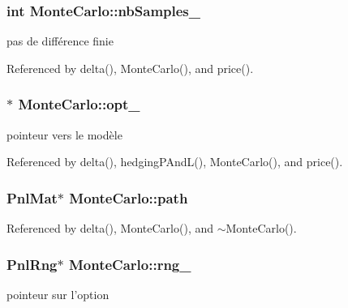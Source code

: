 \hypertarget{classMonteCarlo_a82f5bfded3f8b62f22afaa50f7e73ffe}{
\subsubsection[{nb\-Samples\-\_\-}]{\setlength{\rightskip}{0pt plus 5cm}int Monte\-Carlo\-::nb\-Samples\-\_\-}}\label{classMonteCarlo_a82f5bfded3f8b62f22afaa50f7e73ffe}
pas de différence finie 

Referenced by delta(), Monte\-Carlo(), and price().

\hypertarget{classMonteCarlo_af0ee580b0eb87f57c7a41cd2a9e6fc6a}{
\subsubsection[{opt\-\_\-}]{$\ast$ Monte\-Carlo\-::opt\-\_\-}}\label{classMonteCarlo_af0ee580b0eb87f57c7a41cd2a9e6fc6a}
pointeur vers le modèle 

Referenced by delta(), hedging\-P\-And\-L(), Monte\-Carlo(), and price().

\hypertarget{classMonteCarlo_acf1971465a6503457dfacd397f29ee89}{
\subsubsection[{path}]{\setlength{\rightskip}{0pt plus 5cm}Pnl\-Mat$\ast$ Monte\-Carlo\-::path\hspace{0.3cm}{\ttfamily [private]}}}\label{classMonteCarlo_acf1971465a6503457dfacd397f29ee89}


Referenced by delta(), Monte\-Carlo(), and $\sim$\-Monte\-Carlo().

\hypertarget{classMonteCarlo_aa41318b565311457e04383047d68936e}{
\subsubsection[{rng\-\_\-}]{\setlength{\rightskip}{0pt plus 5cm}Pnl\-Rng$\ast$ Monte\-Carlo\-::rng\-\_\-}}\label{classMonteCarlo_aa41318b565311457e04383047d68936e}
pointeur sur l'option 

